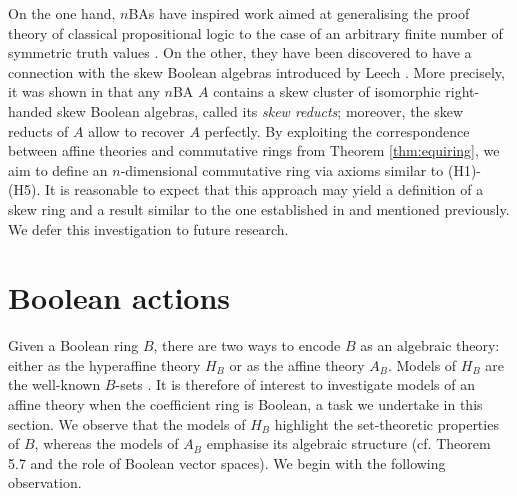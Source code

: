 \documentclass{amsart}
\numberwithin{equation}{section}
\theoremstyle{plain}
\theoremstyle{definition}
\begin{document}
On the one hand, $n$BAs have inspired work aimed at generalising the proof theory of classical propositional logic to the case of an arbitrary finite number of symmetric truth values \cite{BCS24}.
On the other, they have been discovered to have a connection with the skew Boolean algebras introduced by Leech \cite{Leech1,Leech2,Leech3}. 
More precisely, it was shown in \cite{BS} that 
any $n$BA $A$ contains a skew cluster of isomorphic right-handed skew Boolean algebras, called its \emph{skew reducts};
moreover, the skew reducts of $A$ allow to recover $A$ perfectly. 
By exploiting the correspondence between affine theories and commutative rings from Theorem \ref{thm:equiring}, we aim to define an $n$-dimensional commutative ring via 
axioms similar to (H1)-(H5). 
It is reasonable to expect that this approach may yield a definition of a skew ring and a result similar to the one established in \cite{BS} and mentioned previously. 
We defer this investigation to future research.

\section{Boolean actions} 
\label{sec:spaces}
Given a Boolean ring $B$, there are two ways to encode $B$ as an algebraic theory: 
either as the hyperaffine theory $H_B$ or as the affine theory $A_B$. 
Models of $H_B$ are the well-known $B$-sets \cite{B91}. 
It is therefore of interest to investigate models of an affine theory when the coefficient ring is Boolean, a task we undertake in this section. 
We observe that the models of $H_B$ highlight the set-theoretic properties of $B$, 
whereas the models of $A_B$ emphasise its algebraic structure 
(cf. Theorem 5.7 and the role of Boolean vector spaces).
We begin with the following observation. 
\end{document}
